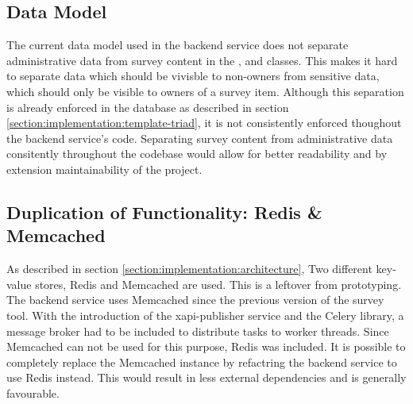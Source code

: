     	\subsection{Data Model}
    		The current data model used in the backend service does
    		not separate administrative data from survey content
    		in the ,  and
    		 classes. This makes it hard to separate
    		data which should be vivisble to non-owners from
    		sensitive data, which should only be visible to owners
    		of a survey item. Although this separation is already
    		enforced in the database as described in section \ref{section:implementation:template-triad},
    		it is not consistently enforced thoughout the backend service's
    		code. Separating survey content from administrative
    		data consitently throughout the codebase would
    		allow for better readability and by extension
    		maintainability of the project.

        \subsection{Duplication of Functionality: Redis \& Memcached}
        	As described in section \ref{section:implementation:architecture},
        	Two different key-value stores, Redis and Memcached are used.
        	This is a leftover from prototyping. The backend service
        	uses Memcached since the previous version of the survey tool.
        	With the introduction of the xapi-publisher service and
        	the Celery library, a message broker had to be included
        	to distribute tasks to worker threads. Since Memcached
        	can not be used for this purpose, Redis was included.
        	It is possible to completely replace the Memcached instance
        	by refactring the backend service to use Redis instead.
        	This would result in less external dependencies and
     		is generally favourable. 

